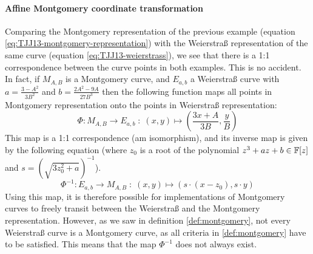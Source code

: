 \paragraph{Affine Montgomery coordinate transformation} Comparing the Montgomery representation of the previous example (equation \ref{eq:TJJ13-montgomery-representation}) with the Weierstraß representation of the same curve (equation \ref{eq:TJJ13-weierstrass}), we see that there is a 1:1 correspondence between the curve points in both examples. This is no accident. In fact, if $M_{A,B}$ is a Montgomery curve, and $E_{a,b}$ a Weierstraß curve with $a = \frac{3-A^2}{3B^2}$ and $b= \frac{2A^2 -9A}{27B^3}$ then the following function maps all points in Montgomery representation onto the points in Weierstraß representation:
\begin{equation}
\Phi: M_{A,B} \to E_{a,b}\; : \; (x,y) \mapsto \left(\frac{3x + A}{3B}, \frac{y}{B}\right)
\end{equation}
This map is a 1:1 correspondence (am isomorphism), and its inverse map is given by the following equation (where $z_0$ is a root of the polynomial $z^3 + a z + b \in \mathbb{F}[z]$ and $s=({\sqrt{3z_0^{2}+a}})^{-1}$).
\begin{equation}
\Phi^{-1}: E_{a,b} \to M_{A,B}\; : \; (x,y) \mapsto \left(s\cdot(x-z_0), s\cdot y\right)
\end{equation}
 Using this map, it is therefore possible for implementations of Montgomery curves to freely transit between the Weierstraß and the Montgomery representation. However, as we saw in definition \ref{def:montgomery}, not every Weierstraß curve is a Montgomery curve, as all criteria in \ref{def:montgomery} have to be satisfied. This means that the map $\Phi^{-1}$ does not always exist. 
 
